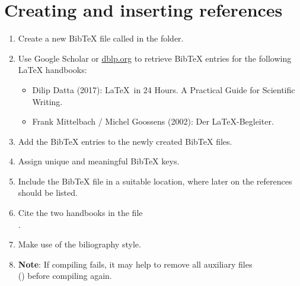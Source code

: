 \section{Creating and inserting references}

\begin{enumerate}
  \item Create a new Bib\TeX{} file called  in the  folder.
  \item Use Google Scholar or \url{dblp.org} to retrieve Bib\TeX{} entries for the following \LaTeX{}
  handbooks:
  \begin{itemize}
    \item Dilip Datta (2017): \LaTeX\ in 24 Hours. A Practical Guide for Scientific Writing.
    \item Frank Mittelbach / Michel Goossens (2002): Der \LaTeX-Begleiter.
  \end{itemize}
  \item Add the Bib\TeX{} entries to the newly created Bib\TeX{} files.
  \item Assign unique and meaningful Bib\TeX{} keys.
  \item Include the Bib\TeX{} file in a suitable location, where later on the references should be listed.
  \item Cite the two handbooks in the 
  file\\.
  \item Make use of the  biliography style.
  \item \textbf{Note}: If compiling fails, it may help to remove all auxiliary 
  files \\() before compiling again.
\end{enumerate}
